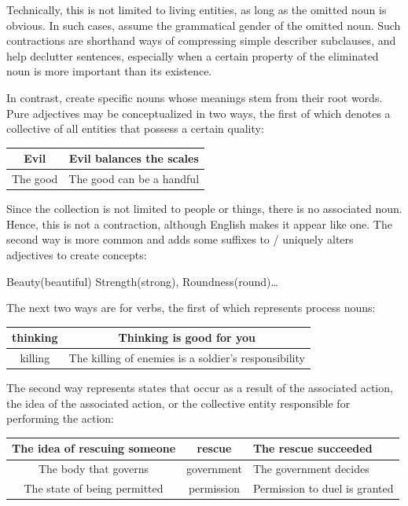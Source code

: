 Technically, this  is not limited to living entities, as long as the omitted noun is obvious. In such  cases, assume the grammatical gender of the omitted noun. Such contractions are  shorthand ways of compressing simple describer subclauses, and help  declutter sentences, especially when a certain property of the eliminated noun is more important than its existence.

In contrast, \textcolor{magenta}{} create specific nouns whose meanings stem from their root words. Pure adjectives may be conceptualized in two ways, the first of which denotes a collective of all entities that possess a certain quality:
\begin{example}
    \begin{tabular}{c|c}
        Evil & Evil  balances the scales\\\hline
        The good & The good can be a handful
    \end{tabular}
\end{example}
Since the collection is not limited to people or things, there is no associated noun. Hence, this is not a contraction, although English makes it appear like one. The second way is more common and adds some suffixes to / uniquely alters adjectives to create concepts:
\begin{example}
    Beauty(beautiful) Strength(strong), Roundness(round)\ldots
\end{example}
The next two ways are for verbs, the first of which represents process nouns:
\begin{example}
    \begin{tabular}{c|c}
        thinking & Thinking is good for you\\\hline
        killing & The killing of enemies is a soldier's responsibility
    \end{tabular}
\end{example}
The second way represents states that occur as a result of the associated action, the idea of  the associated action, or the collective entity responsible for performing the action:
\begin{example}
    \begin{tabular}{c|c|m{6cm}}
        The idea of  rescuing someone & rescue & The rescue succeeded\\\hline
        The body that governs & government & The government decides\\\hline
        The state of being permitted & permission & Permission to duel is granted
    \end{tabular}
\end{example}
